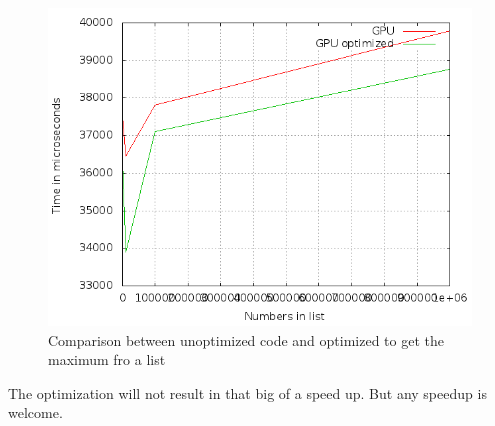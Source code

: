 \documentclass[a4paper]{article}
\begin{document}
  \begin{figure}[H]
	  \begin{center}
		  \includegraphics[scale=0.5]{6_2_2.png}
	  \end{center}
	  \caption{Comparison between unoptimized code and optimized to get the maximum fro a list}
	  \label{fig:6_2_2}
  \end{figure}
  The optimization will not result in that big of a speed up. But any speedup is welcome.
\end{document}
